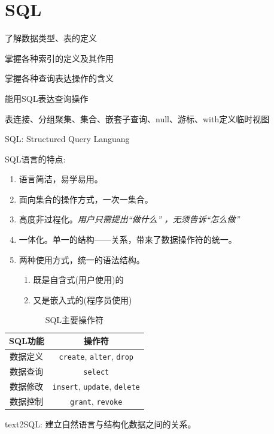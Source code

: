 \chapter{SQL}

\begin{introduction}[期末考试提纲]
  \item 了解数据类型、表的定义
  \item 掌握各种索引的定义及其作用
  \item 掌握各种查询表达操作的含义
  \item 能用SQL表达查询操作
  \item 表连接、分组聚集、集合、嵌套子查询、null、游标、with定义临时视图
\end{introduction}

SQL: Structured Query Languang

SQL语言的特点:
\begin{enumerate}
    \item 语言简洁，易学易用。
    \item 面向集合的操作方式，一次一集合。
    \item 高度非过程化。\textit{用户只需提出“做什么” ，无须告诉“怎么做”}
    \item 一体化。单一的结构——关系，带来了数据操作符的统一。
    \item 两种使用方式，统一的语法结构。
    \begin{enumerate}
        \item 既是自含式(用户使用)的
        \item 又是嵌入式的(程序员使用)
    \end{enumerate}
\end{enumerate}

\begin{table}[H]
  \centering
  \begin{tabular}{|c|c|}
    \hline
    \textbf{SQL功能} & \textbf{操作符} \\
    \hline
    数据定义 & \verb|create|, \verb|alter|, \verb|drop| \\
    \hline
    数据查询 & \verb|select| \\
    \hline
    数据修改 & \verb|insert|, \verb|update|, \verb|delete| \\
    \hline
    数据控制 & \verb|grant|, \verb|revoke| \\
    \hline
  \end{tabular}
  \caption{SQL主要操作符}
\end{table}

text2SQL: 建立自然语言与结构化数据之间的关系。

